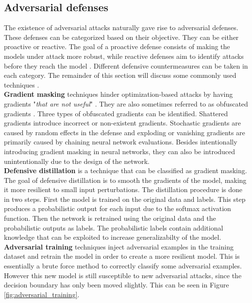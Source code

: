 \subsection{Adversarial defenses}\label{sec:adversarial_defenses}
The existence of adversarial attacks naturally gave rise to adversarial defenses. These defenses can be categorized based on their objective. They can be either proactive or reactive. The goal of a proactive defense consists of making the models under attack more robust, while reactive defenses aim to identify attacks before they reach the model \cite{adversarial_defense_survey}. Different defensive countermeasures can be taken in each category. The remainder of this section will discuss some commonly used techniques \cite{defenses_survey}.\\

\textbf{Gradient masking} techniques hinder optimization-based attacks by having gradients "\textit{that are not useful}" \cite{not_useful_gradients}. They are also sometimes referred to as obfuscated gradients \cite{obfuscated_gradients}. Three types of obfuscated gradients can be identified. Shattered gradients introduce incorrect or non-existent gradients. Stochastic gradients are caused by random effects in the defense and exploding or vanishing gradients are primarily caused by chaining neural network evaluations. Besides intentionally introducing gradient masking in neural networks, they can also be introduced unintentionally due to the design of the network.\\

\textbf{Defensive distillation}  \cite{defensive_distillation} is a technique that can be classified as gradient masking. The goal of defensive distillation is to smooth the gradients of the model, making it more resilient to small input perturbations. The distillation procedure is done in two steps. First the model is trained on the original data and labels. This step produces a probabilistic output for each input due to the softmax activation function. Then the network is retrained using the original data and the probabilistic outputs as labels. The probabilistic labels contain additional knowledge that can be exploited to increase generalizabilty of the model.\\

\textbf{Adversarial training} \cite{FGSM} techniques inject adversarial examples in the training dataset and retrain the model in order to create a more resilient model. This is essentially a brute force method to correctly classify some adversarial examples. However this new model is still susceptible to new adversarial attacks, since the decision boundary has only been moved slightly. This can be seen in Figure \ref{fig:adversarial_training}.\\

